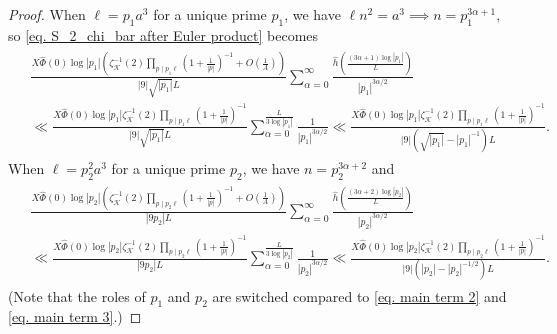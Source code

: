 \documentclass[11pt]{amsart}
\numberwithin{equation}{section}
\theoremstyle{remark}
\begin{document}
\begin{proof}
When $\ell=p_1a^3$ for a unique prime $p_1$, we have $\ell n^2 = a^3 \implies  n=p_1^{3\alpha+1}$, so \eqref{eq. S_2_chi_bar after Euler product} becomes
\begin{align}
\label{eq. chi_bar main term 2}
\begin{split}
    &\frac{X\widehat{\Phi}(0)\log|p_1|\left(\zeta^{-1}_\mathcal{K}(2)  \prod_{p\mid p_1\ell}(1+\frac{1}{|p|})^{-1}+O\left(\frac{1}{A}\right)\right)}{|9|\sqrt{|p_1|} L}
    \sum_{\alpha=0}^\infty
    \frac{\hat{h}\left(\frac{(3\alpha+1)\log |p_1|}{L}\right)}{|p_1|^{3\alpha/2}} 
    \\
    &\ll
    \frac{X\widehat{\Phi}(0)\log|p_1|\zeta^{-1}_\mathcal{K}(2)  \prod_{p\mid p_1\ell}(1+\frac{1}{|p|})^{-1}}{|9|\sqrt{|p_1|}L}
    \sum_{\alpha=0}^{\frac{L}{3\log|p_1|}}
    \frac{1}{|p_1|^{3\alpha/2}}
    \ll
 \frac{X\widehat{\Phi}(0)\log|p_1|\zeta^{-1}_\mathcal{K}(2)  \prod_{p\mid p_1 \ell }(1+\frac{1}{|p|})^{-1}}{|9|(\sqrt{|p_1|}-|p_1|^{-1})L}.
 \end{split}
\end{align}
When $\ell=p_2^2a^3$ for a unique prime $p_2$, we have $n=p_2^{3\alpha+2}$ and
\begin{align}
\label{eq. chi_bar main term 3}
\begin{split}
    &\frac{X\widehat{\Phi}(0)\log|p_2|\left(\zeta^{-1}_\mathcal{K}(2)  \prod_{p\mid p_2\ell}(1+\frac{1}{|p|})^{-1}+O\left(\frac{1}{A}\right)\right)}{|9 p_2|L}
    \sum_{\alpha=0}^\infty
    \frac{\hat{h}\left(\frac{(3\alpha+2)\log |p_2|}{L}\right)}{|p_2|^{3\alpha/2}} 
    \\
    &\ll
    \frac{X\widehat{\Phi}(0)\log|p_2|\zeta^{-1}_\mathcal{K}(2)  \prod_{p\mid p_2\ell}(1+\frac{1}{|p|})^{-1}}{|9 p_2|L}
    \sum_{\alpha=0}^{\frac{L}{3\log|p_2|}}
    \frac{1}{|p_2|^{3\alpha/2}}
    \ll
 \frac{X\widehat{\Phi}(0)\log|p_2|\zeta^{-1}_\mathcal{K}(2)  \prod_{p\mid p_2 \ell }(1+\frac{1}{|p|})^{-1}}{|9|(|p_2|-|p_2|^{-1/2})L}.
\end{split}
\end{align}
(Note that the roles of $p_1$ and $p_2$ are switched compared to \eqref{eq. main term 2} and \eqref{eq. main term 3}.)


\end{proof}
\end{document}

